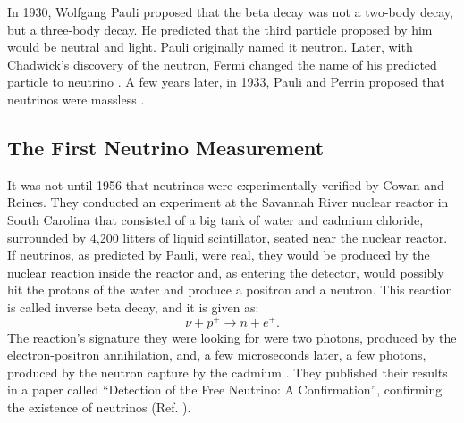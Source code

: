 In 1930, Wolfgang Pauli proposed that the beta decay was not a two-body decay, but a three-body decay. He predicted that the third particle proposed by him would be neutral and light. Pauli originally named it neutron. Later, with Chadwick's discovery of the neutron, Fermi changed the name of his predicted particle to neutrino \cite{griffiths}. A few years later, in 1933, Pauli and Perrin proposed that neutrinos were massless \cite{griffiths}.

\subsection{The First Neutrino Measurement}
It was not until 1956 that neutrinos were experimentally verified by Cowan and Reines. They conducted an experiment at the Savannah River nuclear reactor in South Carolina that consisted of a big tank of water and cadmium chloride, surrounded by 4,200 litters of liquid scintillator, seated near the nuclear reactor. If neutrinos, as predicted by Pauli, were real, they would be produced by the nuclear reaction inside the reactor and, as entering the detector, would possibly hit the protons of the water and produce a positron and a neutron. This reaction is called inverse beta decay, and it is given as:
%
\begin{equation}
	\overline{\nu} + p^+ \longrightarrow n + e^+.
	\label{inverse_beta_decay_eq}
\end{equation}
%
The reaction's signature they were looking for were two photons, produced by the electron-positron annihilation, and, a few microseconds later, a few photons, produced by the neutron capture by the cadmium \cite{nobel_leptons}. They published their results in a paper called “Detection of the Free Neutrino: A Confirmation”, confirming the existence of neutrinos (Ref. \cite{cowan_reines}). 


